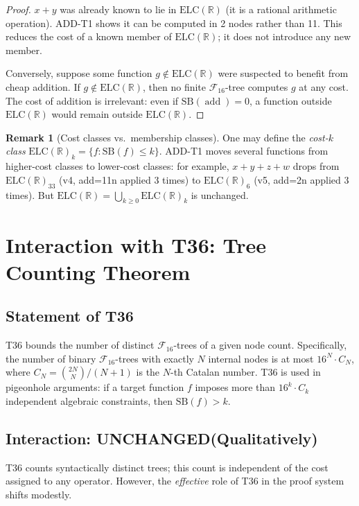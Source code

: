 \documentclass[12pt,a4paper]{article}
\theoremstyle{definition}
\newtheorem{remark}[theorem]{Remark}
\newcommand{\addop}{\operatorname{add}}
\newcommand{\SB}{\mathrm{SB}}
\newcommand{\F}{\mathcal{F}_{16}}
\newcommand{\ELC}{\mathrm{ELC}(\mathbb{R})}
\newcommand{\Unchanged}{\textcolor{unchanged}{\textbf{UNCHANGED}}}
\begin{document}
\begin{proof}
$x+y$ was already known to lie in $\ELC$ (it is a rational arithmetic operation).
ADD-T1 shows it can be computed in 2 nodes rather than 11.  This reduces the cost
of a known member of $\ELC$; it does not introduce any new member.

Conversely, suppose some function $g\notin\ELC$ were suspected to benefit from
cheap addition.  If $g\notin\ELC$, then no finite $\F$-tree computes $g$ at any cost.
The cost of addition is irrelevant: even if $\SB(\addop)=0$, a function outside
$\ELC$ would remain outside $\ELC$.
\end{proof}

\begin{remark}[Cost classes vs.\ membership classes]
One may define the \emph{cost-$k$ class}
$\ELC_k = \{f : \SB(f) \leq k\}$.
ADD-T1 moves several functions from higher-cost classes to lower-cost classes:
for example, $x+y+z+w$ drops from $\ELC_{33}$ (v4, add=11n applied 3 times)
to $\ELC_6$ (v5, add=2n applied 3 times).
But $\ELC = \bigcup_{k\geq 0}\ELC_k$ is unchanged.
\end{remark}

\section{Interaction with T36: Tree Counting Theorem}
\label{sec:T36}

\subsection{Statement of T36}

T36 bounds the number of distinct $\F$-trees of a given node count.
Specifically, the number of binary $\F$-trees with exactly $N$ internal nodes
is at most $16^N \cdot C_N$, where $C_N = \binom{2N}{N}/(N+1)$ is the $N$-th
Catalan number.  T36 is used in pigeonhole arguments: if a target function $f$
imposes more than $16^k\cdot C_k$ independent algebraic constraints, then
$\SB(f)>k$.

\subsection{Interaction: \Unchanged (Qualitatively)}

T36 counts syntactically distinct trees; this count is independent of the cost
assigned to any operator.  However, the \emph{effective} role of T36 in the
proof system shifts modestly.
\end{document}

